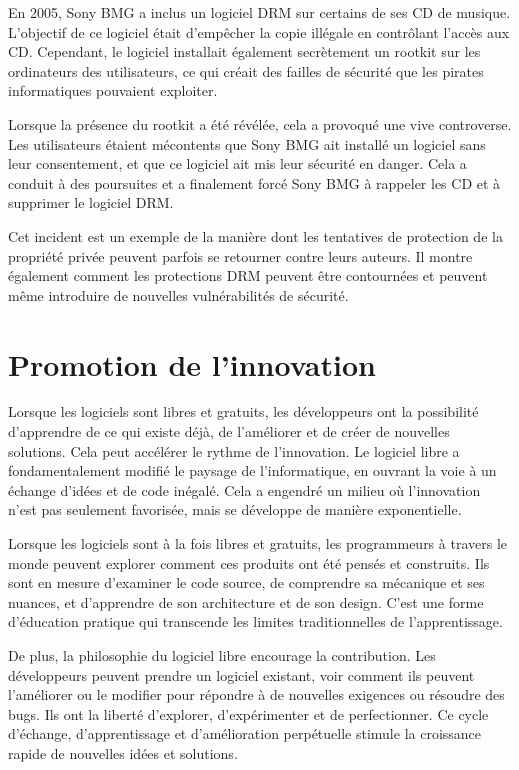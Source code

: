 En 2005, Sony BMG a inclus un logiciel DRM sur certains de ses CD de musique. L'objectif de ce logiciel était d'empêcher la copie illégale en contrôlant l'accès aux CD. Cependant, le logiciel installait également secrètement un rootkit sur les ordinateurs des utilisateurs, ce qui créait des failles de sécurité que les pirates informatiques pouvaient exploiter.

Lorsque la présence du rootkit a été révélée, cela a provoqué une vive controverse. Les utilisateurs étaient mécontents que Sony BMG ait installé un logiciel sans leur consentement, et que ce logiciel ait mis leur sécurité en danger. Cela a conduit à des poursuites et a finalement forcé Sony BMG à rappeler les CD et à supprimer le logiciel DRM.

Cet incident est un exemple de la manière dont les tentatives de protection de la propriété privée peuvent parfois se retourner contre leurs auteurs. Il montre également comment les protections DRM peuvent être contournées et peuvent même introduire de nouvelles vulnérabilités de sécurité. \cite{halderman2006lessons}


\section{Promotion de l'innovation} 
Lorsque les logiciels sont libres et gratuits, les développeurs ont la possibilité d'apprendre de ce qui existe déjà, de l'améliorer et de créer de nouvelles solutions. Cela peut accélérer le rythme de l'innovation.
Le logiciel libre a fondamentalement modifié le paysage de l'informatique, en ouvrant la voie à un échange d'idées et de code inégalé. Cela a engendré un milieu où l'innovation n'est pas seulement favorisée, mais se développe de manière exponentielle.

Lorsque les logiciels sont à la fois libres et gratuits, les programmeurs à travers le monde peuvent explorer comment ces produits ont été pensés et construits. Ils sont en mesure d'examiner le code source, de comprendre sa mécanique et ses nuances, et d'apprendre de son architecture et de son design. C'est une forme d'éducation pratique qui transcende les limites traditionnelles de l'apprentissage.

De plus, la philosophie du logiciel libre encourage la contribution. Les développeurs peuvent prendre un logiciel existant, voir comment ils peuvent l'améliorer ou le modifier pour répondre à de nouvelles exigences ou résoudre des bugs. Ils ont la liberté d'explorer, d'expérimenter et de perfectionner. Ce cycle d'échange, d'apprentissage et d'amélioration perpétuelle stimule la croissance rapide de nouvelles idées et solutions.

